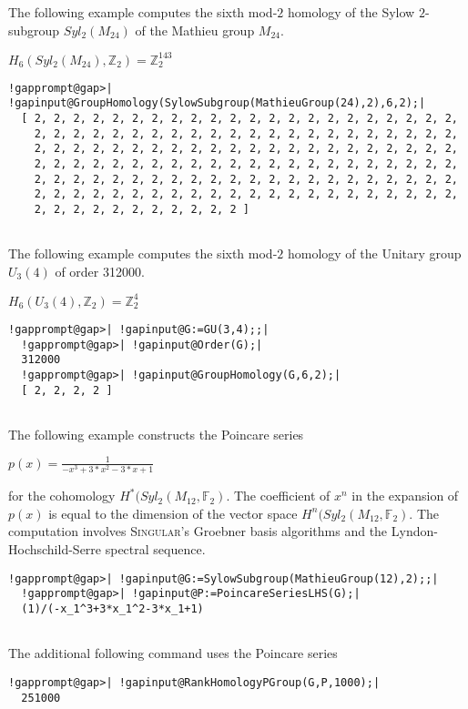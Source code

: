 \documentclass[a4paper,11pt]{report}
\begin{document}
{{The following example computes the sixth mod-$2$ homology of the Sylow $2$-subgroup $Syl_2(M_{24})$ of the Mathieu group $M_{24}$. 

$H_6(Syl_2(M_{24}),\mathbb Z_2) = \mathbb Z_2^{143}$ 
\begin{Verbatim}[commandchars=!@|,fontsize=\small,frame=single,label=Example]
  !gapprompt@gap>| !gapinput@GroupHomology(SylowSubgroup(MathieuGroup(24),2),6,2);|
  [ 2, 2, 2, 2, 2, 2, 2, 2, 2, 2, 2, 2, 2, 2, 2, 2, 2, 2, 2, 2, 2, 2, 
    2, 2, 2, 2, 2, 2, 2, 2, 2, 2, 2, 2, 2, 2, 2, 2, 2, 2, 2, 2, 2, 2, 
    2, 2, 2, 2, 2, 2, 2, 2, 2, 2, 2, 2, 2, 2, 2, 2, 2, 2, 2, 2, 2, 2, 
    2, 2, 2, 2, 2, 2, 2, 2, 2, 2, 2, 2, 2, 2, 2, 2, 2, 2, 2, 2, 2, 2, 
    2, 2, 2, 2, 2, 2, 2, 2, 2, 2, 2, 2, 2, 2, 2, 2, 2, 2, 2, 2, 2, 2, 
    2, 2, 2, 2, 2, 2, 2, 2, 2, 2, 2, 2, 2, 2, 2, 2, 2, 2, 2, 2, 2, 2, 
    2, 2, 2, 2, 2, 2, 2, 2, 2, 2, 2 ]
  
\end{Verbatim}
 

The following example computes the sixth mod-$2$ homology of the Unitary group $U_3(4)$ of order 312000. 

$H_6(U_3(4),\mathbb Z_2) = \mathbb Z_2^{4}$ 
\begin{Verbatim}[commandchars=!@|,fontsize=\small,frame=single,label=Example]
  !gapprompt@gap>| !gapinput@G:=GU(3,4);;|
  !gapprompt@gap>| !gapinput@Order(G);|
  312000
  !gapprompt@gap>| !gapinput@GroupHomology(G,6,2);|
  [ 2, 2, 2, 2 ]
  
\end{Verbatim}
 

The following example constructs the Poincare series 

$p(x)=\frac{1}{-x^3+3*x^2-3*x+1}$ 

for the cohomology $H^\ast(Syl_2(M_{12},\mathbb F_2)$. The coefficient of $x^n$ in the expansion of $p(x)$ is equal to the dimension of the vector space $H^n(Syl_2(M_{12},\mathbb F_2)$. The computation involves \textsc{Singular}'s Groebner basis algorithms and the Lyndon-Hochschild-Serre spectral
sequence. 
\begin{Verbatim}[commandchars=!@|,fontsize=\small,frame=single,label=Example]
  !gapprompt@gap>| !gapinput@G:=SylowSubgroup(MathieuGroup(12),2);;|
  !gapprompt@gap>| !gapinput@P:=PoincareSeriesLHS(G);|
  (1)/(-x_1^3+3*x_1^2-3*x_1+1)
  
\end{Verbatim}
 The additional following command uses the Poincare series 
\begin{Verbatim}[commandchars=!@|,fontsize=\small,frame=single,label=Example]
  !gapprompt@gap>| !gapinput@RankHomologyPGroup(G,P,1000);|
  251000
  

\end{Verbatim}}}
\end{document}
